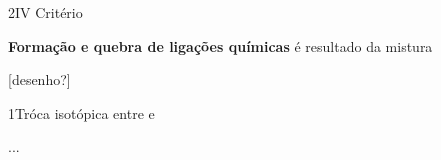 \begin{sectionBox}2{IV Critério}
    
    \textbf{Formação e quebra de ligações químicas} é resultado da mistura \HOMO{}\rightarrow\LUMO{}

    [desenho?]
    
\end{sectionBox}

\begin{questionBox}1{Tróca isotópica entre  e }
    
    \begin{center}
    \end{center}

    ...
    
\end{questionBox}